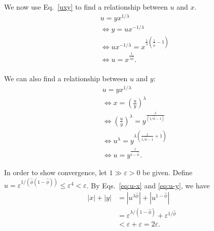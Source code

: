 
We now use Eq.~\eqref{uxy} to find a relationship between $u$ and $x$.%
\begin{equation}
\begin{split}
&u = y x^{1/\lambda}\\
&\Leftrightarrow y = u x^{-1/\lambda}\\
&\Leftrightarrow  u x^{-1/\lambda} = x^{\frac{1}{\lambda}(\frac{1}{\hat\phi} - 1)}\\
&\Leftrightarrow  u = x^{\frac{1}{\lambda \hat\phi}}.\\
\end{split}
\label{eq:u-x}\end{equation}

We can also find a relationship between $u$ and $y$:
\begin{equation}
\begin{split}
&u = y x^{1/\lambda}\\
&\Leftrightarrow x = \left ( \frac{u}{y} \right ) ^\lambda \\
&\Leftrightarrow  \left ( \frac{u}{y} \right ) ^\lambda = y^{\frac{\lambda}{(1/\hat{\phi}-1)}}\\
&\Leftrightarrow  u^\lambda = y^{\lambda \left (\frac{1}{1/\hat{\phi}-1} +1\right )}\\
&\Leftrightarrow  u = y^{\frac{1}{1-\hat{\phi}}}.
\end{split}
\label{eq:u-y}\end{equation}

In order to show convergence, let $1 \gg \varepsilon > 0$ be given.  Define $u = \varepsilon^{1/(\hat{\phi}(1-\hat{\phi}))} \leq \varepsilon^4 < \varepsilon$.  By Eqs.~\eqref{eq:u-x} and \eqref{eq:u-y}, we have
\begin{equation}
\begin{split}
  |x| + |y| &= |u^{\lambda \hat{\phi}}| + |u^{1-\hat{\phi}}| \\
  &= \varepsilon^{\lambda/(1-\hat{\phi})} + \varepsilon^{1/\hat{\phi}} \\
  &< \varepsilon + \varepsilon = 2\varepsilon.
\end{split}
\end{equation}

